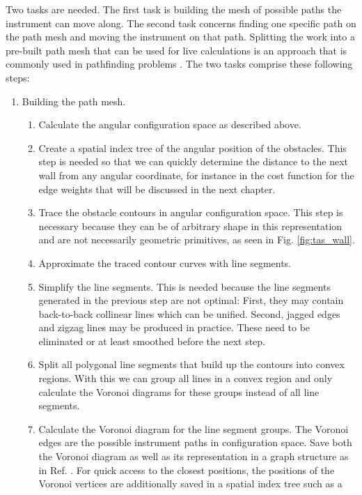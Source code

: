 Two tasks are needed. The first task is building the mesh of possible paths the 
instrument can move along. 
The second task concerns finding one specific path on the path mesh and moving
the instrument on that path. 
Splitting the work into a pre-built path mesh that can be used for live calculations
is an approach that is commonly used in pathfinding problems \cite{Hwang2003, Choset2010_ch5}.
The two tasks comprise these following steps:
\begin{enumerate}
	\item Building the path mesh.
	\begin{enumerate}
		\item Calculate the angular configuration space as described above.
		\item Create a spatial index tree of the angular position of the obstacles.
			This step is needed so that we can quickly determine the distance to
			the next wall from any angular coordinate, for instance in the cost
			function for the edge weights that will be discussed in the next chapter.
		\item Trace the obstacle contours in angular configuration space. 
			This step is necessary because they can be of arbitrary
			shape in this representation and are not necessarily geometric 
			primitives, as seen in Fig. \ref{fig:tas_wall}.
		\item Approximate the traced contour curves with line segments.
		\item Simplify the line segments. This is needed because the line 
			segments generated in the previous step are not optimal:
			First, they may contain back-to-back collinear lines which can be 
			unified. Second, jagged edges and zigzag lines may be
			produced in practice. These need to be eliminated or at least smoothed 
			before the next step.
		\item Split all polygonal line segments that build up the contours into 
			convex regions. With this we can group all lines in a convex region 
			and only calculate the Voronoi diagrams for these groups instead of 
			all line segments.
		\item Calculate the Voronoi diagram for the line segment groups. 
			The Voronoi edges are the possible instrument paths in configuration 
			space. Save both the Voronoi diagram as well as its representation 
			in a graph structure as in Ref. \cite[p. 163]{Berg2008}.
			For quick access to the closest positions, the positions of the
			Voronoi vertices are additionally saved in a spatial index tree such as a 

\end{enumerate}
\end{enumerate}
